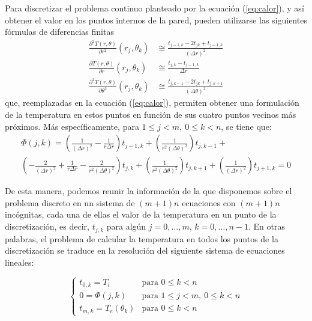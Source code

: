         Para discretizar el problema continuo planteado por la ecuación (\ref{eq:calor}), y así obtener el valor en los puntos internos de la pared, pueden utilizarse las siguientes fórmulas de diferencias finitas
        \begin{align*}
            \frac{\partial^2 T(r, \theta)}{\partial r^2}(r_j, \theta_k) &\cong \frac{t_{j-1,k} - 2 t_{jk} + t_{j+1,k}}{(\Delta r)^2} \\
            \frac{\partial T(r, \theta)}{\partial r}(r_j, \theta_k) &\cong \frac{t_{j,k} - t_{j-1,k}}{\Delta r} \\
            \frac{\partial^2 T(r, \theta)}{\partial \theta^2}(r_j, \theta_k) &\cong \frac{t_{j,k-1} - 2 t_{jk} + t_{j,k+1}}{(\Delta \theta)^2} 
        \end{align*}
        que, reemplazadas en la ecuación (\ref{eq:calor}), permiten obtener una formulación de la temperatura en estos puntos en función de sus cuatro puntos vecinos más próximos. Más específicamente, para $1 \leq j < m,\ 0 \leq k < n$, se tiene que:
        \begin{multline} \label{eq:calor-discreto}
            \Phi(j,k) = \left( \frac{1}{(\Delta r)^2} - \frac{1}{r \Delta r} \right) t_{j-1,k} +
                \left( \frac{1}{r^2(\Delta \theta)^2} \right) t_{j,k-1} + \\
                \left( - \frac{2}{(\Delta r)^2} + \frac{1}{r \Delta r} - \frac{2}{r^2(\Delta \theta)^2} \right) t_{j,k} +
                \left( \frac{1}{r^2(\Delta \theta)^2} \right) t_{j,k+1} +
                \left( \frac{1}{(\Delta r)^2} \right) t_{j+1,k} = 0
        \end{multline}

        De esta manera, podemos reunir la información de la que disponemos sobre el problema discreto en un sistema de $(m+1)n$ ecuaciones con $(m+1)n$ incógnitas, cada una de ellas el valor de la temperatura en un punto de la discretización, es decir, $t_{j,k}$ para algún $j = 0, \dots, m$, $k = 0, \dots, n-1$. En otras palabras, el problema de calcular la temperatura en todos los puntos de la discretización se traduce en la resolución del siguiente sistema de ecuaciones lineales:

        \begin{equation} \label{eq:sistema}
            \begin{cases}
                t_{0,k} = T_i
                    & \text{para } 0 \leq k < n \\
                0 = \Phi(j,k)
                    & \text{para } 1 \leq j < m,\ 0 \leq k < n \\
                t_{m,k} = T_e(\theta_k)
                    & \text{para } 0 \leq k < n
            \end{cases}
        \end{equation}

